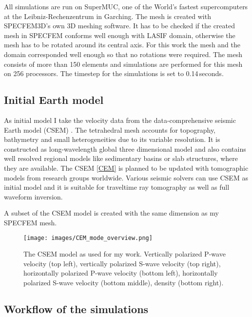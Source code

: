 All simulations are run on SuperMUC, one of the World's fastest supercomputers at the Leibniz-Rechenzentrum in Garching. 
The mesh is created with SPECFEM3D's own 3D meshing software. 
It has to be checked if the created mesh in SPECFEM conforms well enough with LASIF domain, otherwise the mesh has to 
be rotated around its central axis.
For this work the mesh and the domain corresponded well enough so that no rotations were required.
The mesh consists of more than 150 %
elements and simulations are performed for this mesh on 256 processors.
The timestep for the simulations is set to 0.14$\,$seconds.  



\subsection{Initial Earth model}

As initial model I take the velocity data from the data-comprehensive seismic Earth model (CSEM) \citep{Afanasiev2014}.
The tetrahedral mesh accounts for topography, bathymetry and small heterogeneities due to its variable resolution.
It is constructed as long-wavelength global three dimensional model and also contains well resolved regional models
like sedimentary basins or slab structures, where they are available.
The CSEM \autoref{CEM} is planned to be updated with tomographic models from research groups worldwide.
Various seismic solvers can use CSEM as initial model and it is suitable for traveltime ray tomography as well as
full waveform inversion.

A subset of the CSEM model is created with the same dimension as my SPECFEM mesh. 

\begin{figure}[h]
\begin{center}
\texttt{[image: images/CEM\_mode\_overview.png]}
\caption{The CSEM model as used for my work. Vertically polarized P-wave velocity (top left), 
vertically polarized S-wave velocity (top right), horizontally polarized P-wave velocity (bottom left),
horizontally polarized S-wave velocity (bottom middle), density (bottom right).}
\label{CEM}
\end{center}
\end{figure}


\subsection{Workflow of the simulations}


